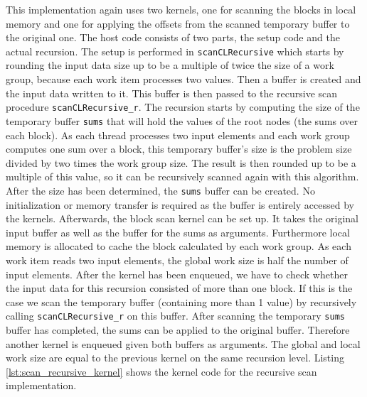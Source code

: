 This implementation again uses two kernels, one for scanning the blocks in local memory and one for applying the offsets from the scanned temporary buffer to the original one. The host code consists of two parts, the setup code and the actual recursion. The setup is performed in \lstinline!scanCLRecursive! which starts by rounding the input data size up to be a multiple of twice the size of a work group, because each work item processes two values. Then a buffer is created and the input data written to it. This buffer is then passed to the recursive scan procedure \lstinline!scanCLRecursive_r!. The recursion starts by computing the size of the temporary buffer \lstinline!sums! that will hold the values of the root nodes (the sums over each block). As each thread processes two input elements and each work group computes one sum over a block, this temporary buffer's size is the problem size divided by two times the work group size. The result is then rounded up to be a multiple of this value, so it can be recursively scanned again with this algorithm. After the size has been determined, the \lstinline!sums! buffer can be created. No initialization or memory transfer is required as the buffer is entirely accessed by the kernels. Afterwards, the block scan kernel can be set up. It takes the original input buffer as well as the buffer for the sums as arguments. Furthermore local memory is allocated to cache the block calculated by each work group. As each work item reads two input elements, the global work size is half the number of input elements. After the kernel has been enqueued, we have to check whether the input data for this recursion consisted of more than one block. If this is the case we scan the temporary buffer (containing more than 1 value) by recursively calling \lstinline!scanCLRecursive_r! on this buffer. After scanning the temporary \lstinline!sums! buffer has completed, the sums can be applied to the original buffer. Therefore another kernel is enqueued given both buffers as arguments. The global and local work size are equal to the previous kernel on the same recursion level.
Listing \ref{lst:scan_recursive_kernel} shows the kernel code for the recursive scan implementation.



